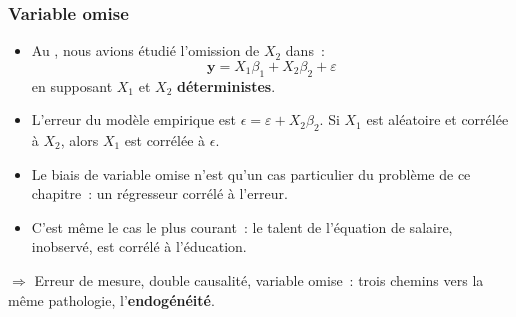 \documentclass[10pt]{beamer}
\begin{document}
\begin{frame}
  \frametitle{Variable omise}

  \begin{itemize}

  \item Au , nous avions étudié l'omission de $X_2$ dans~:
    \[
      \mathbf y = X_1\beta_1 + X_2\beta_2 + \varepsilon
    \]
    en supposant $X_1$ et $X_2$ \textbf{déterministes}.\newline

  \item L'erreur du modèle empirique est $\epsilon = \varepsilon + X_2\beta_2$.
    Si $X_1$ est aléatoire et corrélée à $X_2$, alors $X_1$ est corrélée
    à $\epsilon$.\newline

  \item[$\Rightarrow$] Le biais de variable omise n'est qu'un cas particulier du
    problème de ce chapitre~: un régresseur corrélé à l'erreur.\newline

  \item C'est même le cas le plus courant~: le talent de l'équation de salaire,
    inobservé, est corrélé à l'éducation.

  \end{itemize}

  \bigskip

  $\Rightarrow$ Erreur de mesure, double causalité, variable omise~: trois
  chemins vers la même pathologie, l'\textbf{endogénéité}.

\end{frame}
\end{document}
